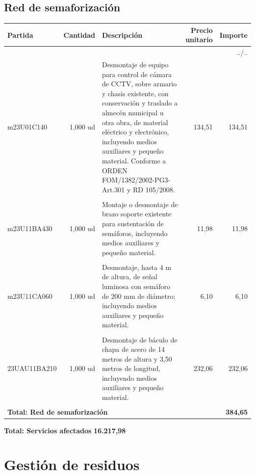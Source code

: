 \documentclass{book}%
\begin{document}
\subsection{Red de semaforización}%
\small%
\begin{longtable}{lrlrr}%
Partida&Cantidad&Descripción&\multicolumn{1}{p{1.5cm}}{Precio unitario}&Importe\\%
\hline%
\endhead%
\multicolumn{5}{r}{../..}\\%
\endfoot%
\hline%
\endlastfoot%
m23U01C140&     1,000 ud&\multicolumn{1}{p{5cm}}{Desmontaje de equipo para control de cámara de CCTV, sobre armario y chasis existente, con conservación y traslado a almecén municipal u otra obra, de material eléctrico y electrónico, incluyendo medios auxiliares y pequeño material. Conforme a ORDEN FOM/1382/2002{-}PG3{-}Art.301 y RD 105/2008.}&    134,51&134,51\\%
&&&&\\%
m23U11BA430&     1,000 ud&\multicolumn{1}{p{5cm}}{Montaje o desmontaje de brazo soporte existente para sustentación de semáforos, incluyendo medios auxiliares y pequeño material.}&     11,98&11,98\\%
&&&&\\%
m23U11CA060&     1,000 ud&\multicolumn{1}{p{5cm}}{Desmontaje, hasta 4 m de altura, de señal luminosa con semáforo de 200 mm de diámetro; incluyendo medios auxiliares y pequeño material.}&      6,10&6,10\\%
&&&&\\%
23UAU11BA210&     1,000 ud&\multicolumn{1}{p{5cm}}{Desmontaje de báculo de chapa de acero de 14 metros de altura y 3,50 metros de longitud, incluyendo medios auxiliares y pequeño material.}&    232,06&232,06\\%
&&&&\\%
\multicolumn{4}{p{8cm}}{\textbf{Total: Red de semaforización}}&\textbf{384,65}\\%
\end{longtable}%
\normalsize

%
\noindent%
\large%
\textbf{Total: Servicios afectados }%
\dotfill%
\textbf{16.217,98}%
\newline%
\normalsize

%
\section{Gestión de residuos}%
\end{document}
